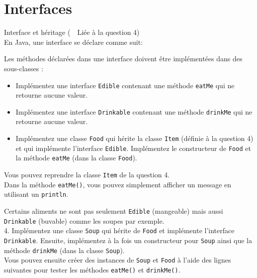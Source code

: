 \section{Interfaces}
\begin{Exercice}[15 minutes]{Interface et héritage (\faLink~~Liée à la question 4)}\\

En Java, une interface se déclare comme suit:
 

Les méthodes déclarées dans une interface doivent être implémentées dans des sous-classes :

 
\begin{itemize}
	\item Implémentez une interface \lstinline{Edible} contenant une méthode \lstinline{eatMe} qui ne retourne aucune valeur.
	\item Implémentez une interface \lstinline{Drinkable} contenant une méthode \lstinline{drinkMe} qui ne retourne aucune valeur.
	\item Implémentez une classe \lstinline{Food} qui hérite la classe \lstinline{Item} (définie à la question 4) et qui implémente l'interface \lstinline{Edible}. Implémentez le constructeur de \lstinline{Food} et la méthode \lstinline{eatMe} (dans la classe \lstinline{Food}).
\end{itemize}

\begin{conseil}
Vous pouvez reprendre la classe \lstinline{Item} de la question 4.\\
Dans la méthode \lstinline{eatMe()}, vous pouvez simplement afficher un message en utilisant un \lstinline{println}.
\end{conseil}

Certains aliments ne sont pas seulement \lstinline{Edible} (mangeable) mais aussi \lstinline{Drinkable} (buvable) comme les soupes par exemple.\\

4. Implémentez une classe \lstinline{Soup} qui hérite de \lstinline{Food} et implémente l'interface \lstinline{Drinkable}. Ensuite, implémentez à la fois un constructeur pour \lstinline{Soup} ainsi que la méthode \lstinline{drinkMe} (dans la classe \lstinline{Soup}).\\

Vous pouvez ensuite créer des instances de \lstinline{Soup} et \lstinline{Food} à l'aide des lignes suivantes pour tester les méthodes \lstinline{eatMe()} et \lstinline{drinkMe()}.
 

\begin{solution}
 
\end{solution}
\end{Exercice}

